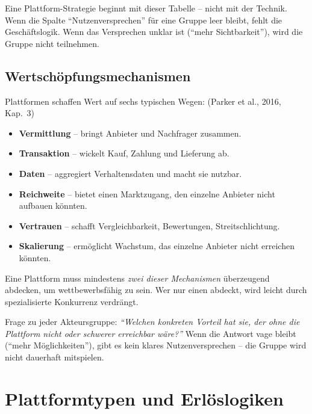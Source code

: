 \documentclass[11pt,a4paper,oneside]{article}
\newcommand{\fachbegriff}[1]{\textbf{#1}}
\newcommand{\quelle}[1]{{\footnotesize\color{lpGray}(#1)}}
\begin{document}
\medskip

\noindent Eine Plattform-Strategie beginnt mit dieser Tabelle -- nicht mit der Technik. Wenn die Spalte ``Nutzenversprechen'' für eine Gruppe leer bleibt, fehlt die Geschäftslogik. Wenn das Versprechen unklar ist (``mehr Sichtbarkeit''), wird die Gruppe nicht teilnehmen.

\subsection{Wertschöpfungsmechanismen}

Plattformen schaffen Wert auf sechs typischen Wegen: \quelle{Parker et al., 2016, Kap.~3}

\begin{itemize}
  \item \fachbegriff{Vermittlung} -- bringt Anbieter und Nachfrager zusammen.
  \item \fachbegriff{Transaktion} -- wickelt Kauf, Zahlung und Lieferung ab.
  \item \fachbegriff{Daten} -- aggregiert Verhaltensdaten und macht sie nutzbar.
  \item \fachbegriff{Reichweite} -- bietet einen Marktzugang, den einzelne Anbieter nicht aufbauen könnten.
  \item \fachbegriff{Vertrauen} -- schafft Vergleichbarkeit, Bewertungen, Streitschlichtung.
  \item \fachbegriff{Skalierung} -- ermöglicht Wachstum, das einzelne Anbieter nicht erreichen könnten.
\end{itemize}

Eine Plattform muss mindestens \emph{zwei dieser Mechanismen} überzeugend abdecken, um wettbewerbsfähig zu sein. Wer nur einen abdeckt, wird leicht durch spezialisierte Konkurrenz verdrängt.

\begin{merkbox}
Frage zu jeder Akteursgruppe: \emph{``Welchen konkreten Vorteil hat sie, der ohne die Plattform nicht oder schwerer erreichbar wäre?''} Wenn die Antwort vage bleibt (``mehr Möglichkeiten''), gibt es kein klares Nutzenversprechen -- die Gruppe wird nicht dauerhaft mitspielen.
\end{merkbox}

\section{Plattformtypen und Erlöslogiken}
\end{document}
